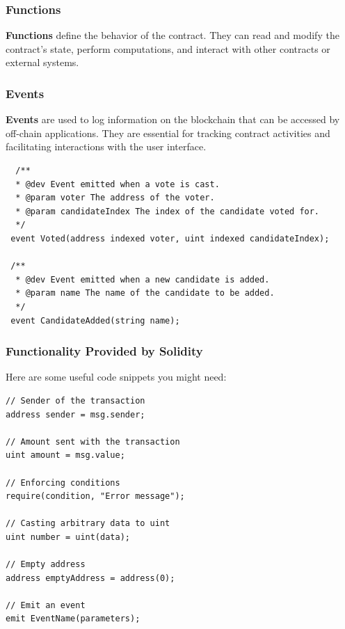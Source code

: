 \documentclass[12pt]{article}
\begin{document}
\subsubsection{Functions}

\textbf{Functions} define the behavior of the contract. They can read and modify the contract's state, perform computations, and interact with other contracts or external systems.

\subsubsection{Events}

\textbf{Events} are used to log information on the blockchain that can be accessed by off-chain applications. They are essential for tracking contract activities and facilitating interactions with the user interface.

\begin{verbatim}
  /**
  * @dev Event emitted when a vote is cast.
  * @param voter The address of the voter.
  * @param candidateIndex The index of the candidate voted for.
  */
 event Voted(address indexed voter, uint indexed candidateIndex);

 /**
  * @dev Event emitted when a new candidate is added.
  * @param name The name of the candidate to be added.
  */
 event CandidateAdded(string name);
\end{verbatim}

\subsubsection{Functionality Provided by Solidity}
Here are some useful code snippets you might need:

\begin{verbatim}
// Sender of the transaction
address sender = msg.sender;

// Amount sent with the transaction
uint amount = msg.value;

// Enforcing conditions
require(condition, "Error message");

// Casting arbitrary data to uint
uint number = uint(data);

// Empty address
address emptyAddress = address(0);

// Emit an event
emit EventName(parameters);
\end{verbatim}
\end{document}
